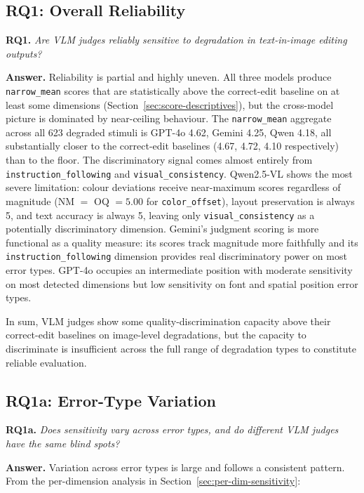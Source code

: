 \subsection*{RQ1: Overall Reliability}

\textbf{RQ1.} \textit{Are VLM judges reliably sensitive to degradation in text-in-image editing outputs?}

\textbf{Answer.} Reliability is partial and highly uneven. All three models produce \texttt{narrow\_mean} scores that are statistically above the correct-edit baseline on at least some dimensions (Section~\ref{sec:score-descriptives}), but the cross-model picture is dominated by near-ceiling behaviour. The \texttt{narrow\_mean} aggregate across all 623 degraded stimuli is GPT-4o 4.62, Gemini 4.25, Qwen 4.18, all substantially closer to the correct-edit baselines (4.67, 4.72, 4.10 respectively) than to the floor. The discriminatory signal comes almost entirely from \texttt{instruction\_following} and \texttt{visual\_consistency}. Qwen2.5-VL shows the most severe limitation: colour deviations receive near-maximum scores regardless of magnitude (NM $=$ OQ $= 5.00$ for \texttt{color\_offset}), layout preservation is always 5, and text accuracy is always 5, leaving only \texttt{visual\_consistency} as a potentially discriminatory dimension. Gemini's judgment scoring is more functional as a quality measure: its scores track magnitude more faithfully and its \texttt{instruction\_following} dimension provides real discriminatory power on most error types. GPT-4o occupies an intermediate position with moderate sensitivity on most detected dimensions but low sensitivity on font and spatial position error types.

In sum, VLM judges show some quality-discrimination capacity above their correct-edit baselines on image-level degradations, but the capacity to discriminate is insufficient across the full range of degradation types to constitute reliable evaluation.

\subsection*{RQ1a: Error-Type Variation}

\textbf{RQ1a.} \textit{Does sensitivity vary across error types, and do different VLM judges have the same blind spots?}

\textbf{Answer.} Variation across error types is large and follows a consistent pattern. From the per-dimension analysis in Section~\ref{sec:per-dim-sensitivity}:

